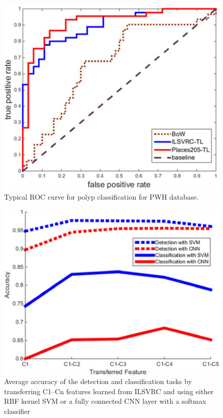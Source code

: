 \documentclass[10pt,twocolumn,letterpaper]{article}
\begin{document}
\begin{figure}[t]
	\begin{center}
		\includegraphics[width=0.8\linewidth]{Pic/7.jpg}
	\end{center}
	\caption{Typical ROC curve for polyp classification for PWH database.}
	\label{fig:long}
	\label{fig:onecol}
\end{figure}

\begin{figure}[t]
	\begin{center}
		\includegraphics[width=0.8\linewidth]{Pic/8.jpg}
	\end{center}
	\caption{Average accuracy of the detection and classification tasks by transferring C1–Cn features learned from ILSVRC and using either RBF kernel SVM or a fully connected CNN layer with a softmax classifier}
	\label{fig:long}
	\label{fig:onecol}
\end{figure}
\end{document}
